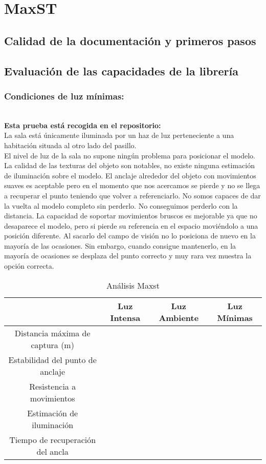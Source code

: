 \section{MaxST}
\subsection{Calidad de la documentación y primeros pasos}

\subsection{Evaluación de las capacidades de la librería}
\subsubsection{Condiciones de luz mínimas:}\\
\textbf{Esta prueba está recogida en el repositorio:}\\
La sala está únicamente iluminada por un haz de luz perteneciente a una habitación situada al otro lado del pasillo.\\

El nivel de luz de la sala no supone ningún problema para posicionar el modelo. La calidad de las texturas del objeto son notables, no existe ninguna estimación de iluminación sobre el modelo. El anclaje alrededor del objeto con movimientos suaves es aceptable pero en el momento que nos acercamos se pierde y no se llega a recuperar el punto teniendo que volver a referenciarlo.  No somos capaces de dar la vuelta al modelo completo sin perderlo. No conseguimos perderlo con la distancia. La capacidad de soportar movimientos bruscos es mejorable ya que no desaparece el modelo, pero si pierde su referencia en el espacio moviéndolo a una posición diferente. Al sacarlo del campo de visión no lo posiciona de nuevo en la mayoría de las ocasiones. Sin embargo, cuando consigue mantenerlo, en la mayoría de ocasiones se desplaza del punto correcto y muy rara vez muestra la opción correcta.

\begin{table}[H]
\resizebox{\textwidth}{!} {
    \centering
    \begin{tabular}{|c|c|c|c|}
    \hline
         & Luz Intensa & Luz Ambiente & Luz Mínimas \\
         \hline
        Distancia máxima de captura (m) & & &\\
        \hline
        Estabilidad del punto de anclaje & & &\\
        \hline
        Resistencia a movimientos & & & \\
        \hline
        Estimación de iluminación & & & \\
        \hline
        Tiempo de recuperación del ancla & & & \\
      \hline
    \end{tabular}
  }
    \caption{Análisis Maxst}
    \label{tab:TMaxst}
\end{table}
